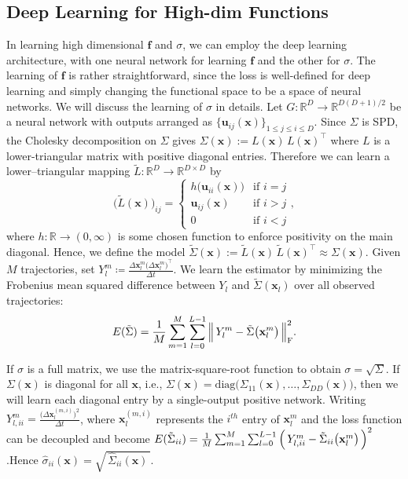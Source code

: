 \documentclass[11pt]{article} %
\def\rvx{{\mathbf{x}}}
\def\vf{{\bm{f}}}
\def\vu{{\bm{u}}}
\def\vx{{\bm{x}}}
\newcommand{\R}{\mathbb{R}}
\newcommand{\loss}{\mathcal{E}}
\begin{document}
\subsection{Deep Learning for High-dim Functions}\label{sec:DL_learn}
%
In learning high dimensional $\vf$ and $\sigma$, we can employ the deep learning architecture, with one neural network for learning $\vf$ and the other for $\sigma$.  The learning of $\vf$ is rather straightforward, since the loss is well-defined for deep learning and simply changing the functional space to be a space of neural networks.  We will discuss the learning of $\sigma$ in details. Let $G:\R^{D}\to\R^{D(D+1)/2}$ be a neural network with outputs arranged as $\{\vu_{ij}(\vx)\}_{1\le j\le i\le D}$.   Since $\Sigma$ is SPD, the Cholesky decomposition on $\Sigma$ gives $\Sigma(\vx):=L(\vx)\,L(\vx)^\intercal$ where $L$ is a lower-triangular matrix with positive diagonal entries.  Therefore we can learn a lower–triangular mapping $\tilde{L}:\R^{D}\to\R^{D\times D}$ by
\[
\big(\tilde{L}(\vx)\big)_{ij} = \begin{cases}
h\big(\vu_{ii}(\vx)\big) & \text{if } i = j \\
\vu_{ij}(\vx) & \text{if } i > j \\
0 & \text{if } i < j
\end{cases},
\]
where $h:\R\to(0,\infty)$ is some chosen function to enforce positivity on the main diagonal. Hence, we define the model $\tilde \Sigma(\vx):=\tilde{L}(\vx)\,\tilde{L}(\vx)^\intercal \approx \Sigma(\vx)$. Given $M$ trajectories, set $Y^{m}_l\coloneqq\frac{\Delta\rvx^{m}_l\big(\Delta\rvx^{m}_l\big)^\intercal}{\Delta t}$.  We learn the estimator by minimizing the Frobenius mean squared difference between $Y_l$ and $\tilde \Sigma(\rvx_{l})$ over all observed trajectories:
\begin{equation}\label{eq:QVMM}
\mathcal \loss(\tilde \Sigma)
= \frac{1}{M}\sum_{m=1}^{M} \sum_{l=0}^{L-1}
\Big\|\,Y^{m}_l-\tilde \Sigma\big(\rvx^{m}_{l}\big)\,\Big\|_{\mathrm F}^{2}.
\end{equation}

If $\sigma$ is a full matrix, we use the matrix-square-root function to obtain $\sigma = \sqrt{\Sigma}$.  If $\Sigma(\rvx)$ is diagonal for all $\vx$, i.e., $\Sigma(\vx)=\mathrm{diag}\big(\Sigma_{11}(\vx),\dots,\Sigma_{DD}(\vx)\big)$, then we will learn each diagonal entry by a single-output positive network. Writing $Y^{m}_{l,ii}=\frac{\big(\Delta \rvx^{(m,i)}_l\big)^2}{\Delta t}$, where \(\rvx^{(m,i)}_l \) represents the $i^{th}$ entry of \(\rvx_l^m\) and the loss function can be decoupled and become $\mathcal \loss(\tilde \Sigma_{ii})
=\frac{1}{M}\sum_{m=1}^{M}\sum_{l=0}^{L-1}\Big(\,Y^{m}_{l,ii}-\tilde\Sigma_{ii}\big(\rvx^{m}_{l}\big)\,\Big)^{2}$.Hence $\hat\sigma_{ii}(\vx)=\sqrt{\,\hat\Sigma_{ii}(\vx)\,}$.
%
\end{document}
